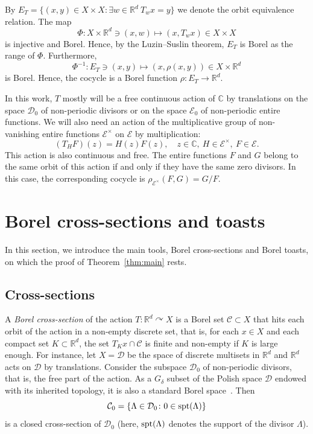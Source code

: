 \documentclass[11pt]{paper}
\newcommand{\bR}{\mathbb R}
\newcommand{\bC}{\mathbb C}
\newcommand{\cE}{\mathcal E}
\newcommand{\cD}{\mathcal D}
\newcommand{\cC}{\mathcal C}
\begin{document}
By $E_T = \{ (x, y)\in X\times X\colon \exists w\in\bR^d\ T_w x = y\}$ we denote the orbit equivalence relation. The map
\[
\Phi\colon X\times \bR^d \ni (x, w) \mapsto (x, T_w x)\in X\times X
\]
is injective and Borel. Hence, by the Luzin--Suslin theorem, $E_T$ is Borel as the range of $\Phi$.
Furthermore,
\[
\Phi^{-1}\colon E_T\ni (x, y)\mapsto (x, \rho(x, y))\in X\times \bR^d
\]
is Borel. Hence, the cocycle is a Borel function $\rho\colon E_T\to \bR^d$.

In this work, $T$ mostly will be a free continuous action of $\bC$ by translations on the space $\cD_0$
of non-periodic divisors or on the space $\cE_0$ of non-periodic entire functions.
We will also need an action of the
multiplicative group of non-vanishing entire functions $\cE^\times$ on $\cE$ by multiplication:
\begin{equation}\label{eq:mult_action}
(T_H F) (z) = H(z)F(z), \quad z\in \bC, \ H\in\cE^\times, \ F\in \cE.
\end{equation}
This action is also continuous and free.
The entire functions $F$ and $G$ belong to the same orbit of this action if and only if they have the same zero divisors.  In this case, the corresponding cocycle is $\rho_{\cE^\times} (F, G) = G/F$.


\section{Borel cross-sections and toasts}
In this section, we introduce the main tools, Borel cross-sections and Borel toasts, on which the proof of Theorem~\ref{thm:main} rests.

\subsection{Cross-sections}
A {\em Borel cross-section} of the action $ T\colon \bR^d \curvearrowright X$ is a Borel set
$\cC\subset X$ that hits each orbit of the action in a non-empty discrete set, that is, for each
$x\in X$ and each compact set $K\subset\bR^d$, the set $T_K x \cap \cC$ is finite and non-empty if
\(K\) is large enough.  For instance, let $X=\cD$ be the space of discrete multisets in $\bR^d$ and
$\bR^d$ acts on $\cD$ by translations.  Consider the subspace $\cD_0$ of non-periodic divisors, that
is, the free part of the action.  As a $G_\delta$ subset of the Polish space $\cD$ endowed with its
inherited topology, it is also a standard Borel space~\cite[Proposition~3.3.7]{Srivastava}. Then
\[ \cC_0 = \{\Lambda\in \cD_0\colon 0\in{\rm spt}(\Lambda)\} \]
is a closed cross-section of $ \cD_0$ (here, ${\rm spt}(\Lambda)$ denotes the support
of the divisor $\Lambda$).
\end{document}
